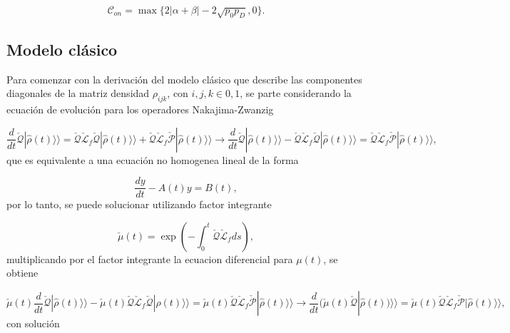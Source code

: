 \begin{appendixs}
\begin{equation*}
    \mathcal{C}_{on} = \max\{ 2|\alpha+\beta| - 2\sqrt{p_{0}p_{D}},0\}.
\end{equation*}

\label{appendix5final}

\subsection{Modelo clásico}
Para comenzar con la derivación del modelo clásico que describe las componentes diagonales de la matriz densidad $\rho_{ijk}$, con $i,j,k \in {0,1}$, se parte considerando la ecuación de evolución para los operadores Nakajima-Zwanzig

\begin{equation*}
    \frac{d}{dt}\check{\mathcal{Q}}|\hat{\rho}(t)\rangle \rangle = \check{\mathcal{Q}}\check{\mathcal{L}}_{f}\check{\mathcal{Q}}|\hat{\rho}(t)\rangle \rangle + \check{\mathcal{Q}}\check{\mathcal{L}}_{f}\check{\mathcal{P}}|\hat{\rho}(t)\rangle \rangle \to \frac{d}{dt}\check{\mathcal{Q}}|\hat{\rho}(t)\rangle \rangle - \check{\mathcal{Q}}\check{\mathcal{L}}_{f}\check{\mathcal{Q}}|\hat{\rho}(t)\rangle \rangle = \check{\mathcal{Q}}\check{\mathcal{L}}_{f}\check{\mathcal{P}}|\hat{\rho}(t)\rangle \rangle ,
\end{equation*}
que es equivalente a una ecuación no homogenea lineal de la forma

\begin{equation*}
    \frac{dy}{dt} - A(t)y = B(t),
\end{equation*}
por lo tanto, se puede solucionar utilizando factor integrante

\begin{equation*}
    \check{\mu}(t) = \exp\left( - \int_{0}^{t}\check{\mathcal{Q}}\check{\mathcal{L}}_{f}ds \right),
\end{equation*}
multiplicando por el factor integrante la ecuacion diferencial para $\mu(t)$, se obtiene 

\begin{equation*}
    \check{\mu}(t)\frac{d}{dt}\check{\mathcal{Q}}|\hat{\rho}(t)\rangle \rangle - \check{\mu}(t)\check{\mathcal{Q}}\check{\mathcal{L}}_{f}\check{\mathcal{Q}}|\hat{\rho}(t)\rangle \rangle  = \check{\mu}(t)\check{\mathcal{Q}}\check{\mathcal{L}}_{f}\check{\mathcal{P}}|\hat{\rho}(t)\rangle \rangle  \to \frac{d}{dt}(\check{\mu}(t)\check{\mathcal{Q}}|\hat{\rho}(t))\rangle \rangle = \check{\mu}(t)\check{\mathcal{Q}}\check{\mathcal{L}}_{f}\check{\mathcal{P}}|\hat{\rho}(t)\rangle \rangle ,
\end{equation*}
con solución


\end{appendixs}
